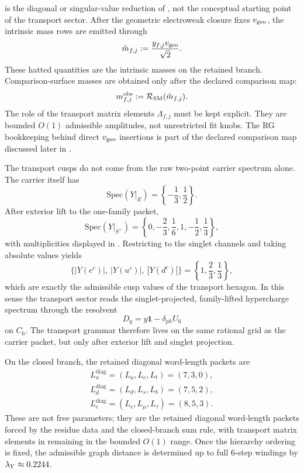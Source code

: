  is the diagonal or singular-value reduction of
, not the conceptual starting point of the transport sector.
After the geometric electroweak closure fixes $v_{\mathrm{geo}}$, the intrinsic mass rows are emitted through
\begin{equation}
\label{eq:mass-bridge}
\hat m_{f,j}:=\frac{y_{f,j}v_{\mathrm{geo}}}{\sqrt2}.
\end{equation}
These hatted quantities are the intrinsic masses on the retained branch. Comparison-surface masses
are obtained only after the declared comparison map:
\[
m_{f,j}^{\mathrm{obs}}:=\mathcal R_{\mathrm{SM}}(\hat m_{f,j}).
\]
The role of the transport matrix elements $\Lambda_{f,j}$ must be kept explicit. They are bounded $O(1)$ admissible amplitudes, not unrestricted fit knobs. The RG bookkeeping behind direct $v_{\mathrm{geo}}$ insertions is part of the declared comparison map discussed later in .

\begin{remark}
The transport cusps do not come from the raw two-point carrier spectrum alone. The carrier itself has
\[
\mathrm{Spec}(Y|_E)=\left\{-\frac13,\frac12\right\}.
\]
After exterior lift to the one-family packet,
\[
\mathrm{Spec}(Y|_{S^+})
=
\left\{0,-\frac23,\frac16,1,-\frac12,\frac13\right\},
\]
with multiplicities displayed in . Restricting to the singlet channels and taking absolute values yields
\[
\{|Y(e^c)|,\ |Y(u^c)|,\ |Y(d^c)|\}
=
\left\{1,\frac23,\frac13\right\},
\]
which are exactly the admissible cusp values of the transport hexagon. In this sense the transport sector reads the singlet-projected, family-lifted hypercharge spectrum through the resolvent
\[
D_y=y\mathbf 1-\delta_{ph}U_6
\]
on $C_6$. The transport grammar therefore lives on the same rational grid as the carrier packet, but only after exterior lift and singlet projection.
\end{remark}

On the closed branch, the retained diagonal word-length packets are
\begin{equation}
\label{eq:minimal-word-lengths}
\begin{gathered}
L_u^{\mathrm{diag}}=(L_u,L_c,L_t)=(7,3,0),\\
L_d^{\mathrm{diag}}=(L_d,L_s,L_b)=(7,5,2),\\
L_e^{\mathrm{diag}}=(L_e,L_\mu,L_\tau)=(8,5,3).
\end{gathered}
\end{equation}
These are not free parameters; they are the retained diagonal word-length packets forced by the
residue data and the closed-branch sum rule, with transport matrix elements in
 remaining in the bounded $O(1)$ range. Once the hierarchy ordering is
fixed, the admissible graph distance is determined up to full $6$-step windings by
$\lambda_Y\approx\num{0.2244}$.

